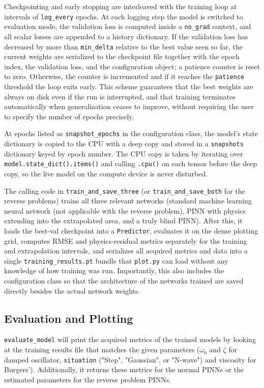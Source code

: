 \documentclass[12pt, a4paper]{report}
\begin{document}
Checkpointing and early stopping are interleaved with the training loop at intervals of \verb|log_every| epochs. At each logging step the model is switched to evaluation mode, the validation loss is computed inside a \verb|no_grad| context, and all scalar losses are appended to a history dictionary. If the validation loss has decreased by more than \verb|min_delta| relative to the best value seen so far, the current weights are serialized to the checkpoint file together with the epoch index, the validation loss, and the configuration object; a patience counter is reset to zero. Otherwise, the counter is incremented and if it reaches the \verb|patience| threshold the loop exits early. This scheme guarantees that the best weights are always on disk even if the run is interrupted, and that training terminates automatically when generalization ceases to improve, without requiring the user to specify the number of epochs precisely.

At epochs listed as \verb|snapshot_epochs| in the configuration class, the model's state dictionary is copied to the CPU with a deep copy and stored in a \verb|snapshots| dictionary keyed by epoch number. The CPU copy is taken by iterating over \verb|model.state_dict().items()| and calling \verb|.cpu()| on each tensor before the deep copy, so the live model on the compute device is never disturbed. 

The calling code in \verb|train_and_save_three| (or \verb|train_and_save_both| for the reverse problems) trains all three relevant networks (standard machine learning neural network (not applicable with the reverse problem), PINN with physics extending into the extrapolated area, and a truly blind PINN). After this, it loads the best-val checkpoint into a \verb|Predictor|, evaluates it on the dense plotting grid, computes RMSE and physics-residual metrics separately for the training and extrapolation intervals, and serializes all acquired metrics and data into a single \verb|training_results.pt| bundle that \verb|plot.py| can load without any knowledge of how training was run. Importantly, this also includes the configuration class so that the architecture of the networks trained are saved directly besides the actual network weights.

\subsection{Evaluation and Plotting}
\verb|evaluate_model| will print the acquired metrics of the trained models by looking at the training results file that matches the given parameters ($\omega_0$ and $\zeta$ for damped oscillator, \verb|situation| ("Step", "Gaussian", or "N-wave") and viscosity for Burgers'). Additionally, it returns these metrics for the normal PINNs or the estimated parameters for the reverse problem PINNs.
\end{document}
